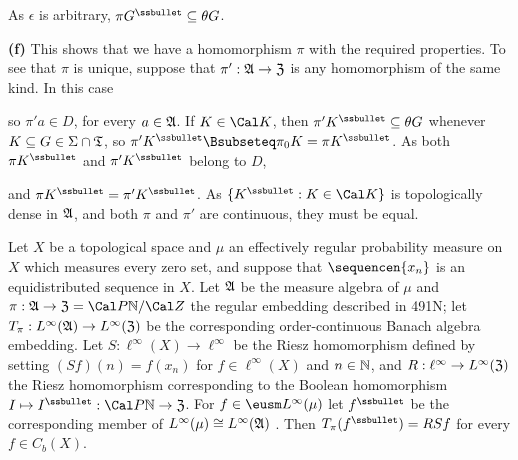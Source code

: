 {\noindent As $\epsilon$ is arbitrary,
$\pi G^{\ssbullet}\subseteq\theta G$.

\medskip

{\bf (f)} This shows that we have a homomorphism $\pi$ with the
required
properties.   To see that $\pi$ is unique, suppose that
$\pi':\frak A\to\frak Z$ is any
homomorphism of the same kind.   In this case


\noindent so $\pi'a\in D$, for every $a\in\frak A$.   If $K\in\Cal K$,
then $\pi'K^{\ssbullet}\subseteq\theta G$ whenever $K\subseteq
G\in\Sigma\cap\frak T$, so
$\pi'K^{\ssbullet}\Bsubseteq\pi_0K=\pi K^{\ssbullet}$.   As both $\pi
K^{\ssbullet}$ and $\pi'K^{\ssbullet}$ belong to $D$,


\noindent and $\pi K^{\ssbullet}=\pi'K^{\ssbullet}$.   As
$\{K^{\ssbullet}:K\in\Cal K\}$ is topologically dense in $\frak A$,
and both $\pi$ and $\pi'$ are continuous,
they must be equal.
}%

 Let $X$ be a topological space and $\mu$ an
effectively regular probability measure on $X$ which measures every zero
set, and suppose that
$\sequencen{x_n}$ is an equidistributed sequence in $X$.   Let $\frak A$
be the measure algebra of $\mu$ and
$\pi:\frak A\to\frak Z=\Cal P\Bbb N/\Cal Z$ the regular embedding
described in 491N;  let
$T_{\pi}:L^{\infty}(\frak A)\to L^{\infty}(\frak Z)$ be the corresponding
order-continuous Banach algebra embedding.   Let
$S:\ell^{\infty}(X)\to\ell^{\infty}$ be the Riesz homomorphism defined
by setting $(Sf)(n)=f(x_n)$ for
$f\in\ell^{\infty}(X)$ and $n\in\Bbb N$, and
$R:\ell^{\infty}\to L^{\infty}(\frak Z)$ the Riesz homomorphism
corresponding to the Boolean homomorphism
$I\mapsto I^{\ssbullet}:\Cal P\Bbb N\to\frak Z$.   For
$f\in\eusm L^{\infty}(\mu)$ let $f^{\ssbullet}$ be the corresponding
member of $L^{\infty}(\mu)\cong L^{\infty}(\frak A)$
.   Then $T_{\pi}(f^{\ssbullet})=RSf$ for every
$f\in C_b(X)$.

